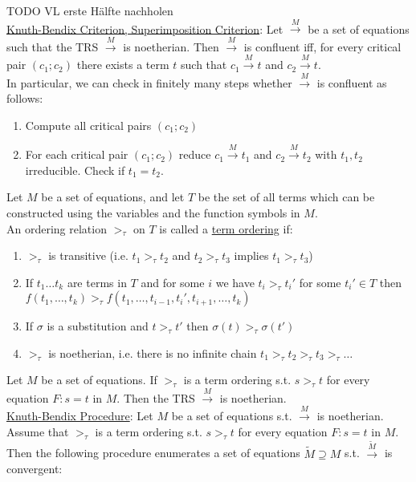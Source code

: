 \documentclass[a4paper]{article}
\newcommand{\ul}{\underline}
\begin{document}
TODO VL erste Hälfte nachholen\\
\ul{Knuth-Bendix Criterion, Superimposition Criterion}: Let $\overset{M}{\rightarrow}$ be a set of equations such that the TRS $\overset{M}{\rightarrow}$ is noetherian. Then $\overset{M}{\rightarrow}$ is confluent iff, for every critical pair $(c_1;c_2)$ there exists a term $t$ such that $c_1\overset{M}{\rightarrow}t$ and $c_2\overset{M}{\rightarrow}t$.\\
In particular, we can check in finitely many steps whether $\overset{M}{\rightarrow}$ is confluent as follows:
\begin{enumerate}[(1)]
	\item Compute all critical pairs $(c_1;c_2)$
	\item For each critical pair $(c_1;c_2)$ reduce $c_1\overset{M}{\rightarrow}t_1$ and $c_2\overset{M}{\rightarrow}t_2$ with $t_1,t_2$ irreducible. Check if $t_1=t_2$.
\end{enumerate}
Let $M$ be a set of equations, and let $T$ be the set of all terms which can be constructed using the variables and the function symbols in $M$.\\
An ordering relation $>_\tau$ on $T$ is called a \ul{term ordering} if:
\begin{enumerate}
	\item $>_\tau$ is transitive (i.e. $t_1>_\tau t_2$ and $t_2>_\tau t_3$ implies $t_1>_\tau t_3$)
	\item If $t_1\dots t_k$ are terms in $T$ and for some $i$ we have $t_i>_\tau t_i'$ for some $t_i'\in T$ then $f(t_1,\dots,t_k)>_\tau f(t_1,\dots,t_{i-1},t_i',t_{i+1},\dots,t_k)$
	\item If $\sigma$ is a substitution and $t>_\tau t'$ then $\sigma(t)>_\tau\sigma(t')$
	\item $>_\tau$ is noetherian, i.e. there is no infinite chain $t_1>_\tau t_2>_\tau t_3>_\tau \dots$
\end{enumerate}
Let $M$ be a set of equations. If $>_\tau$ is a term ordering s.t. $s>_\tau t$ for every equation $F:s=t$ in $M$. Then the TRS $\overset{M}{\rightarrow}$ is noetherian.\\
\ul{Knuth-Bendix Procedure}: Let $M$ be a set of equations s.t. $\overset{M}{\rightarrow}$ is noetherian. Assume that $>_\tau$ is a term ordering s.t. $s>_\tau t$ for every equation $F:s=t$ in $M$.\\
Then the following procedure enumerates a set of equations $\tilde M\supseteq M$ s.t. $\overset{\tilde M}{\rightarrow}$ is convergent:
\end{document}
